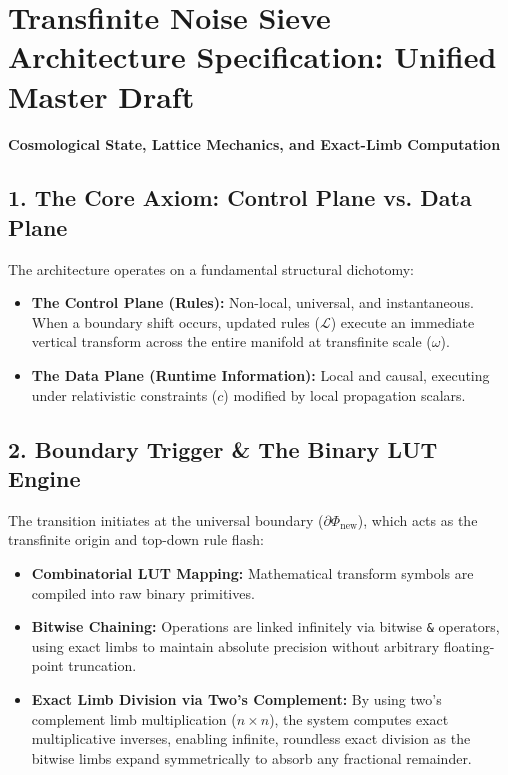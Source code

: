 \chapter{\texorpdfstring{Transfinite Noise Sieve Architecture Specification: Unified Master Draft}{Transfinite Noise Sieve Architecture Specification: Unified Master Draft}}
\label{chap:noise-sieve-2-lut-beamformer-collapse}

\textbf{Cosmological State, Lattice Mechanics, and Exact-Limb Computation}

\medskip

\section{\texorpdfstring{1. The Core Axiom: Control Plane vs. Data Plane}{1. The Core Axiom: Control Plane vs. Data Plane}}

The architecture operates on a fundamental structural dichotomy:

\begin{itemize}
\item \textbf{The Control Plane (Rules):} Non-local, universal, and instantaneous. When a boundary shift occurs, updated rules (\(\mathcal{L}\)) execute an immediate vertical transform across the entire manifold at transfinite scale (\(\omega\)).
\item \textbf{The Data Plane (Runtime Information):} Local and causal, executing under relativistic constraints (\(c\)) modified by local propagation scalars.
\end{itemize}

\medskip

\section{\texorpdfstring{2. Boundary Trigger \& The Binary LUT Engine}{2. Boundary Trigger \& The Binary LUT Engine}}

The transition initiates at the universal boundary (\(\partial\Phi_{\text{new}}\)), which acts as the transfinite origin and top-down rule flash:

\begin{itemize}
\item \textbf{Combinatorial LUT Mapping:} Mathematical transform symbols are compiled into raw binary primitives.
\item \textbf{Bitwise Chaining:} Operations are linked infinitely via bitwise \texttt{\&} operators, using exact limbs to maintain absolute precision without arbitrary floating-point truncation.
\item \textbf{Exact Limb Division via Two's Complement:} By using two's complement limb multiplication (\(n \times n\)), the system computes exact multiplicative inverses, enabling infinite, roundless exact division as the bitwise limbs expand symmetrically to absorb any fractional remainder.
\end{itemize}


